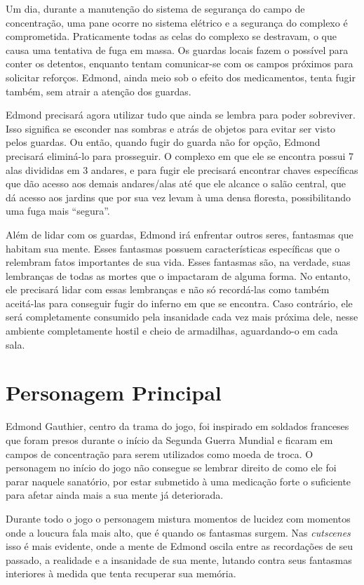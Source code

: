 \documentclass[12pt]{article}
\begin{document}
    Um dia, durante a manutenção do sistema de segurança do campo de concentração, uma pane ocorre no sistema elétrico e a segurança do complexo é comprometida. Praticamente todas as celas do complexo se destravam, o que causa uma tentativa de fuga em massa. Os guardas locais fazem o possível para conter os detentos, enquanto tentam comunicar-se com os campos próximos para solicitar reforços. Edmond, ainda meio sob o efeito dos medicamentos, tenta fugir também, sem atrair a atenção dos guardas. 
    
    Edmond precisará agora utilizar tudo que ainda se lembra para poder sobreviver. Isso significa se esconder nas sombras e atrás de objetos para evitar ser visto pelos guardas. Ou então, quando fugir do guarda não for opção, Edmond precisará eliminá-lo para prosseguir. O complexo em que ele se encontra possui 7 alas divididas em 3 andares, e para fugir ele precisará encontrar chaves específicas que dão acesso aos demais andares/alas até que ele alcance o salão central, que dá acesso aos jardins que por sua vez levam à uma densa floresta, possibilitando uma fuga mais “segura”.
    
    Além de lidar com os guardas, Edmond irá enfrentar outros seres, fantasmas que habitam sua mente. Esses fantasmas possuem características específicas que o relembram fatos importantes de sua vida. Esses fantasmas são, na verdade, suas lembranças de todas as mortes que o impactaram de alguma forma. No entanto, ele precisará lidar com essas lembranças e não só recordá-las como também aceitá-las para conseguir fugir do inferno em que se encontra. Caso contrário, ele será completamente consumido pela insanidade cada vez mais próxima dele, nesse ambiente completamente hostil e cheio de armadilhas, aguardando-o em cada sala. 

\section{Personagem Principal}
Edmond Gauthier, centro da trama do jogo, foi inspirado em soldados franceses que foram presos durante o início da Segunda Guerra Mundial e ficaram em campos de concentração para serem utilizados como moeda de troca. O personagem no início do jogo não consegue se lembrar direito de como ele foi parar naquele sanatório, por estar submetido à uma medicação forte o suficiente para afetar ainda mais a sua mente já deteriorada.

Durante todo o jogo o personagem mistura momentos de lucidez com momentos onde a loucura fala mais alto, que é quando os fantasmas surgem. Nas \textit{cutscenes} isso é mais evidente, onde a mente de Edmond oscila entre as recordações de seu passado, a realidade e a insanidade de sua mente, lutando contra seus fantasmas interiores à medida que tenta recuperar sua memória.
\end{document}
